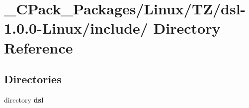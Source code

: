 \section{\_\-CPack\_\-Packages/Linux/TZ/dsl-\/1.0.0-\/Linux/include/ Directory Reference}
\label{dir_f77462ddf413e62e3785411da562ad53}
\subsection*{Directories}
\begin{DoxyCompactItemize}
\item 
directory {\bf dsl}
\end{DoxyCompactItemize}
